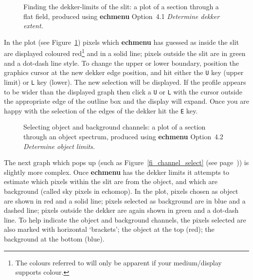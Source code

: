 \documentclass[twoside,11pt]{article}
\newcommand{\scspec}[2]{#1}
\newcommand{\scspec}[2]{#2}
\begin{document}
\begin{figure}
\begin{center}
  \scspec{\leavevmode\epsfysize=100mm\epsfbox{sc7_12.eps}}
         {\leavevmode\epsfysize=136mm}

  \parbox{140mm}{
    \caption{Finding the dekker-limits of the slit: a plot of a section
             through a flat field, produced using {\bf echmenu} Option~4.1
             {\sl Determine dekker extent.}}
    \label{fi_dekker_limits}
  }
\end{center}
\end{figure}

In the plot (see \scspec{Figure~\ref{fi_dekker_limits}}{the figure above})
pixels which {\bf echmenu} has guessed as inside the slit are
displayed coloured
red\scspec{\footnote{The colours referred to will only be apparent if your
medium/display supports colour.}}
{(the colours referred to here will only be apparent if your
medium/display supports colour)}
and in a solid line; pixels outside the slit
are in green and a dot-dash line style.  To change the upper or lower
boundary, position the graphics cursor at the new dekker edge position,
and hit either the \verb+U+ key (upper limit) or \verb+L+ key (lower).
The new selection will be displayed.  If the profile appears to be wider
than the displayed graph then click a \verb+U+ or \verb+L+ with the
cursor outside the appropriate edge of the outline box and the display
will expand.  Once you are happy with the selection of the edges of
the dekker hit the \verb+E+ key.

\begin{htmlonly}
\begin{figure}
\begin{center}
  \leavevmode\epsfysize=136mm

  \parbox{140mm}{
    \caption{Selecting object and background channels: a plot of a section
             through an object spectrum, produced using {\bf echmenu}
             Option~4.2 {\sl Determine object limits.}}
    \label{fi_channel_select_again}
  }
\end{center}
\end{figure}
\end{htmlonly}

The next graph which pops up (such as
\scspec{Figure~\ref{fi_channel_select} (see page~\pageref{fi_channel_select})}
{the figure above}) is slightly more complex.  Once {\bf echmenu} has the
dekker limits it attempts to estimate which pixels within the slit are from
the object, and which are background (called sky pixels in {\sc echomop})\@.
In the plot, pixels chosen as object are shown in red and a solid line;
pixels selected as background are in blue and a dashed line;
pixels outside the dekker are again shown in green and a dot-dash line.
To help indicate the object and background channels, the pixels selected
are also marked with horizontal `brackets'; the object at the top (red);
the background at the bottom (blue).
\end{document}
